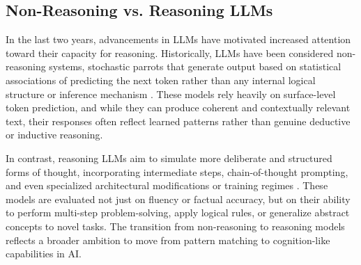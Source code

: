 \documentclass{article}
\begin{document}




\subsection{Non-Reasoning vs. Reasoning LLMs}

In the last two years, advancements in LLMs have motivated increased attention toward their capacity for reasoning. Historically, LLMs have been considered non-reasoning systems, stochastic parrots that generate output based on statistical associations of predicting the next token rather than any internal logical structure or inference mechanism \citep{10.1145/3442188.3445922}. These models rely heavily on surface-level token prediction, and while they can produce coherent and contextually relevant text, their responses often reflect learned patterns rather than genuine deductive or inductive reasoning.

In contrast, reasoning LLMs aim to simulate more deliberate and structured forms of thought, incorporating intermediate steps, chain-of-thought prompting, and even specialized architectural modifications or training regimes \citep{wei2023chainofthoughtpromptingelicitsreasoning}. These models are evaluated not just on fluency or factual accuracy, but on their ability to perform multi-step problem-solving, apply logical rules, or generalize abstract concepts to novel tasks. The transition from non-reasoning to reasoning models reflects a broader ambition to move from pattern matching to cognition-like capabilities in AI.
\end{document}
